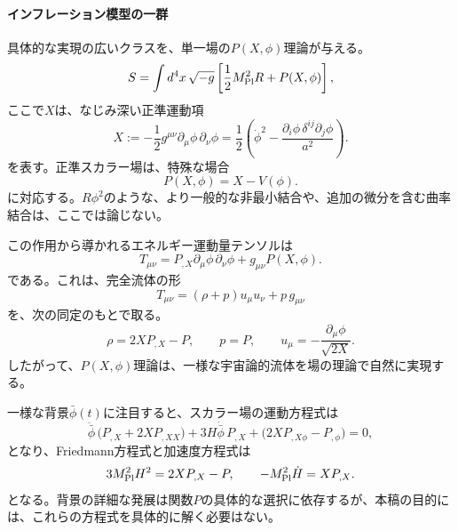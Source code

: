 \documentclass[a4paper,11pt,oneside]{article}
\theoremstyle{definition}
\numberwithin{equation}{section}
\begin{document}
\paragraph{インフレーション模型の一群} 具体的な実現の広いクラスを、単一場の\(P(X,\phi)\)理論が与える。
\begin{equation}
S=\int d^4x\,\sqrt{-g}\left[\frac12 M_{\rm Pl}^2R+P(X,\phi)\right] ,
\end{equation}
ここで$ X$は、なじみ深い正準運動項
\begin{equation}
X:=-\frac12 g^{\mu\nu}\partial_\mu\phi\,\partial_\nu\phi
=
\frac12\left(\dot\phi^2-\frac{\partial_i\phi\,\delta^{ij}\partial_j\phi}{a^2}\right) .
\end{equation}
を表す。正準スカラー場は、特殊な場合
\begin{equation}
P(X,\phi)=X-V(\phi) .
\end{equation}
に対応する。\(R\phi^2\)のような、より一般的な非最小結合や、追加の微分を含む曲率結合は、ここでは論じない。



この作用から導かれるエネルギー運動量テンソルは
\begin{equation}
T_{\mu\nu}=P_{,X}\partial_\mu\phi\,\partial_\nu\phi+g_{\mu\nu}P(X,\phi) .
\end{equation}
である。これは、完全流体の形
\begin{equation}
T_{\mu\nu}=(\rho+p)u_\mu u_\nu + p\,g_{\mu\nu}
\end{equation}
を、次の同定のもとで取る。
\begin{equation}
\rho = 2X P_{,X}-P ,
\qquad
p = P ,
\qquad
u_\mu = -\frac{\partial_\mu\phi}{\sqrt{2X}} .
\end{equation}
したがって、\(P(X,\phi)\)理論は、一様な宇宙論的流体を場の理論で自然に実現する。



一様な背景\(\bar\phi(t)\)に注目すると、スカラー場の運動方程式は
\begin{equation}
\ddot{\bar\phi}\,\bigl(P_{,X}+2X P_{,XX}\bigr)
+
3H\dot{\bar\phi}\,P_{,X}
+
\bigl(2X P_{,X\phi}-P_{,\phi}\bigr)
=0 ,
\end{equation}
となり、Friedmann方程式と加速度方程式は
\begin{equation}
3M_{\rm Pl}^2H^2 = 2X P_{,X}-P ,
\qquad
- M_{\rm Pl}^2\dot H = X P_{,X} .
\end{equation}
となる。背景の詳細な発展は関数\(P\)の具体的な選択に依存するが、本稿の目的には、これらの方程式を具体的に解く必要はない。
\end{document}
